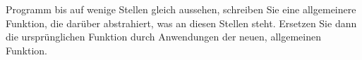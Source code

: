   Programm bis auf wenige Stellen gleich aussehen, schreiben Sie
  eine allgemeinere Funktion, die darüber abstrahiert, was an diesen
  Stellen steht.  Ersetzen Sie dann die ursprünglichen Funktion durch
  Anwendungen der neuen, allgemeinen Funktion.
